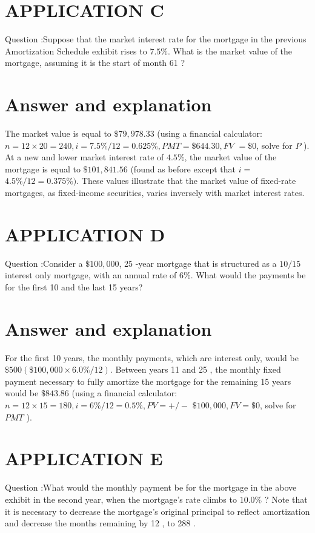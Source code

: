 \documentclass[11pt]{article}
\begin{document}
\section*{APPLICATION C}
Question :Suppose that the market interest rate for the mortgage in the previous Amortization Schedule exhibit rises to $7.5 \%$. What is the market value of the mortgage, assuming it is the start of month 61 ?

\section*{Answer and explanation}
The market value is equal to $\$ 79,978.33$ (using a financial calculator: $n=12 \times 20=240, i=7.5 \% / 12=0.625 \%, P M T=\$ 644.30, F V$ $=\$ 0$, solve for $P$ ). At a new and lower market interest rate of $4.5 \%$, the market value of the mortgage is equal to $\$ 101,841.56$ (found as before except that $i=$ $4.5 \% / 12=0.375 \%)$. These values illustrate that the market value of fixed-rate mortgages, as fixed-income securities, varies inversely with market interest rates.

\section*{APPLICATION D}
Question :Consider a $\$ 100,000$, 25 -year mortgage that is structured as a $10 / 15$ interest only mortgage, with an annual rate of $6 \%$. What would the payments be for the first 10 and the last 15 years?

\section*{Answer and explanation}
For the first 10 years, the monthly payments, which are interest only, would be $\$ 500(\$ 100,000 \times 6.0 \% / 12)$. Between years 11 and 25 , the monthly fixed payment necessary to fully amortize the mortgage for the remaining 15 years would be $\$ 843.86$ (using a financial calculator: $n=12 \times 15=180, i=6 \% / 12=0.5 \%, P V=+/-$ $\$ 100,000, F V=\$ 0$, solve for $P M T$ ).

\section*{APPLICATION E}
Question :What would the monthly payment be for the mortgage in the above exhibit in the second year, when the mortgage's rate climbs to $10.0 \%$ ? Note that it is necessary to decrease the mortgage's original principal to reflect amortization and decrease the months remaining by 12 , to 288 .
\end{document}
